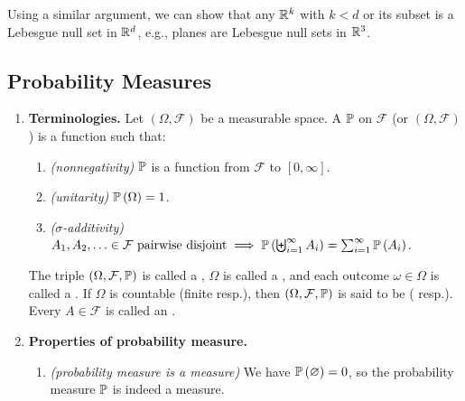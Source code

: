 \begin{enumerate}
\begin{itemize}
\begin{note}
Using a similar argument, we can show that any \(\mathbb{R}^k\) with \(k<d\) or its
subset is a Lebesgue null set in \(\mathbb{R}^d\), e.g., planes are Lebesgue null sets
in \(\mathbb{R}^3\).
\end{note}
\end{itemize}
\end{enumerate}
\subsection{Probability Measures}
\label{subsect:prob-meas}
\begin{enumerate}
\item \textbf{Terminologies.} Let \((\Omega,\mathcal{F})\) be a measurable
space. A  \(\mathbb{P}\) on \(\mathcal{F}\) (or
\((\Omega,\mathcal{F})\)) is a function such that:
\begin{enumerate}[label={(\arabic*)}]
\item \emph{(nonnegativity)} \(\mathbb{P}\) is a function from \(\mathcal{F}\) to \([0,\infty]\).
\item \emph{(unitarity)} \(\mathbb{P}\left(\Omega\right)=1\).
\item \emph{(\(\sigma\)-additivity)} \(A_1,A_2,\dotsc\in\mathcal{F}\text{
pairwise disjoint}\implies
\mathbb{P}\left(\biguplus_{i=1}^{\infty}A_i\right)=\sum_{i=1}^{\infty}\mathbb{P}\left(A_i\right)\).
\end{enumerate}
The triple \((\Omega,\mathcal{F},\mathbb{P})\) is called a ,
\(\Omega\) is called a , and each outcome
\(\omega\in\Omega\) is called a . If \(\Omega\) is countable
(finite resp.), then \((\Omega,\mathcal{F},\mathbb{P})\) is said to be 
( resp.).  Every \(A\in\mathcal{F}\) is called an .

\item\label{it:prob-meas-prop} \textbf{Properties of probability measure.}
\begin{enumerate}
\item \emph{(probability measure is a measure)} We have
\(\mathbb{P}\left(\varnothing\right)=0\), so the probability measure \(\mathbb{P}\) is indeed a
measure.


\end{enumerate}
\end{enumerate}
